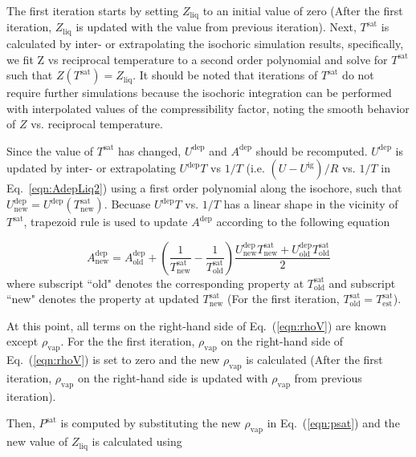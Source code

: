 \documentclass[5p,times]{elsarticle}
\begin{document}
The first iteration starts by setting $Z_\mathrm{liq}$ to an initial value of zero (After the first iteration, $Z_\mathrm{liq}$ is updated with the value from previous iteration). Next, $T^\mathrm{sat}$ is calculated by inter- or extrapolating the isochoric simulation results, specifically, we fit Z vs reciprocal temperature to a second order polynomial and solve for $T^\mathrm{sat}$ such that $Z(T^\mathrm{sat})=Z_\mathrm{liq}$. It should be noted that iterations of $T^\mathrm{sat}$ do not require further simulations because the isochoric integration can be performed with interpolated values of the compressibility factor, noting the smooth behavior of $Z$ vs. reciprocal temperature.

Since the value of $T^\mathrm{sat}$ has changed, $U^\mathrm{dep}$ and $A^\mathrm{dep}$ should be recomputed. $U^\mathrm{dep}$ is updated by inter- or extrapolating $U^\mathrm{dep}T$ vs $1/T$ (i.e. $(U-U^\mathrm{ig})/R$ vs. $1/T$ in Eq.~\ref{eqn:AdepLiq2}) using a first order polynomial along the isochore, such that $U^\mathrm{dep}_\mathrm{new} = U^\mathrm{dep}(T^\mathrm{sat}_\mathrm{new})$. Becuase $U^\mathrm{dep}T$ vs. $1/T$ has a linear shape in the vicinity of $T^\mathrm{sat}$, trapezoid rule is used to update $A^\mathrm{dep}$ according to the following equation

\begin{equation}
A^\mathrm{dep}_\mathrm{new} = A^\mathrm{dep}_\mathrm{old} + \left( \frac{1}{T^\mathrm{sat}_\mathrm{new}}-\frac{1}{T^\mathrm{sat}_\mathrm{old}} \right) \frac{U^\mathrm{dep}_\mathrm{new}T^\mathrm{sat}_\mathrm{new}+U^\mathrm{dep}_\mathrm{old}T^\mathrm{sat}_\mathrm{old}}{2} 
\label{eqn:aDepCorrection}
\end{equation}
where subscript ``old" denotes the corresponding property at $T^\mathrm{sat}_\mathrm{old}$ and subscript ``new" denotes the property at updated $T^\mathrm{sat}_\mathrm{new}$ (For the first iteration, $T^\mathrm{sat}_\mathrm{old} = T^\mathrm{sat}_\mathrm{est}$). 

At this point, all terms on the right-hand side of Eq.~(\ref{eqn:rhoV}) are known except $\rho_\mathrm{vap}$. For the the first iteration, $\rho_\mathrm{vap}$ on the right-hand side of Eq.~(\ref{eqn:rhoV}) is set to zero and the new $\rho_\mathrm{vap}$ is calculated (After the first iteration, $\rho_\mathrm{vap}$ on the right-hand side is updated with $\rho_\mathrm{vap}$ from previous iteration). 

Then, $P^\mathrm{sat}$ is computed by substituting the new $\rho_\mathrm{vap}$ in Eq.~(\ref{eqn:psat}) and the new value of $Z_\mathrm{liq}$ is calculated using
\end{document}
